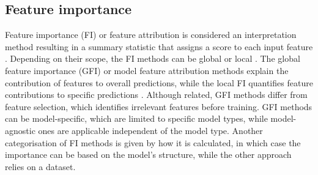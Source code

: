 




%
%
%
%

\subsection{Feature importance} \label{subsec:feature-importance-in-tree-ensemble-models}
Feature importance (FI) or feature attribution is considered an interpretation method resulting in a summary statistic that assigns a score to each input feature \cite{Molnar2022}.
Depending on their scope, the FI methods can be global or local \cite{Guidotti2018,Molnar2022}.
The global feature importance (GFI) or model feature attribution methods explain the contribution of features to overall predictions, while the local FI quantifies feature contributions to specific predictions \cite{Molnar2022}.
Although related, GFI methods differ from feature selection, which identifies irrelevant features before training.
GFI methods can be model-specific, which are limited to specific model types, while model-agnostic ones are applicable independent of the model type\cite{Molnar2022}.
Another categorisation of FI methods is given by how it is calculated, in which case the importance can be based on the model's structure, while the other approach relies on a dataset.


